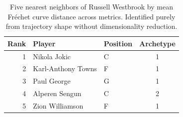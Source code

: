 \begin{table}[htbp]
  \centering\small
  \begin{tabular}{rllc}
    \toprule
    Rank & Player & Position & Archetype \\
    \midrule
    1 & Nikola Jokic & C & 1 \\
    2 & Karl-Anthony Towns & F & 1 \\
    3 & Paul George & G & 1 \\
    4 & Alperen Sengun & C & 2 \\
    5 & Zion Williamson & F & 1 \\
    \bottomrule
  \end{tabular}
  \caption{Five nearest neighbors of Russell Westbrook by mean Fr\'{e}chet curve distance across metrics. Identified purely from trajectory shape without dimensionality reduction.}
  \label{tab:Russell_Westbrook_frechet_curve_neighbors}
\end{table}

